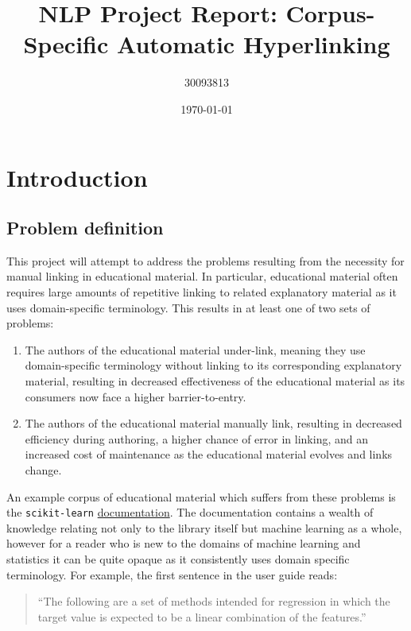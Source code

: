 \documentclass[manuscript,screen,review]{acmart}
\author{30093813}
\date{\today}
\title{NLP Project Report: Corpus-Specific Automatic Hyperlinking}
\begin{document}
\maketitle

\section*{Introduction}
\label{sec:org4f12b5b}

\subsection*{Problem definition}
\label{sec:org8d466f4}
This project will attempt to address the problems resulting from the
necessity for manual linking in educational material. In particular,
educational material often requires large amounts of repetitive
linking to related explanatory material as it uses domain-specific
terminology. This results in at least one of two sets of problems:

\begin{enumerate}
\item The authors of the educational material under-link, meaning they
use domain-specific terminology without linking to its
corresponding explanatory material, resulting in decreased
effectiveness of the educational material as its consumers now face
a higher barrier-to-entry.
\item The authors of the educational material manually link, resulting in
decreased efficiency during authoring, a higher chance of error in
linking, and an increased cost of maintenance as the educational
material evolves and links change.
\end{enumerate}


An example corpus of educational material which suffers from these
problems is the \texttt{scikit-learn} \citep{scikit-learn} \href{https://scikit-learn.org/stable/index.html}{documentation}. The
documentation contains a wealth of knowledge relating not only to the
library itself but machine learning as a whole, however for a reader
who is new to the domains of machine learning and statistics it can be
quite opaque as it consistently uses domain specific terminology. For
example, the first sentence in the user guide reads:

\begin{quote}
``The following are a set of methods intended for regression in which
the target value is expected to be a linear combination of the
features.''
\end{quote}
\end{document}
